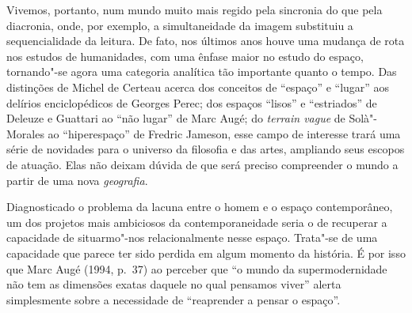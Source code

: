 Vivemos, portanto, num mundo muito mais regido pela sincronia do que
pela diacronia, onde, por exemplo, a simultaneidade da imagem substituiu
a sequencialidade da leitura. De fato, nos últimos anos houve uma
mudança de rota nos estudos de humanidades, com uma ênfase maior no
estudo do espaço, tornando"-se agora uma categoria analítica tão
importante quanto o tempo. Das distinções de Michel de Certeau acerca
dos conceitos de ``espaço'' e ``lugar'' aos delírios
enciclopédicos de Georges Perec; dos espaços ``lisos'' e ``estriados'' de
Deleuze e Guattari ao ``não lugar'' de Marc Augé; do \emph{terrain
vague} de Solà"-Morales ao ``hiperespaço'' de Fredric Jameson, esse
campo de interesse trará uma série de novidades para o universo da
filosofia e das artes, ampliando seus escopos de atuação. Elas não
deixam dúvida de que será preciso compreender o mundo a partir de uma
nova \emph{geografia}.

Diagnosticado o problema da lacuna entre o homem e o espaço
contemporâneo, um dos projetos mais ambiciosos da contemporaneidade
seria o de recuperar a capacidade de situarmo"-nos relacionalmente nesse
espaço. Trata"-se de uma capacidade que parece ter sido perdida em algum
momento da história. É por isso que Marc Augé (1994, p.~37) ao perceber que ``o mundo
da supermodernidade não tem as dimensões exatas daquele no qual
pensamos viver'' alerta simplesmente sobre a necessidade de
``reaprender a pensar o espaço''.

